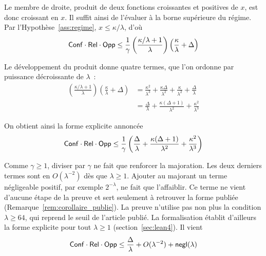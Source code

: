 \begin{sloppypar}
\begin{Preuve}
    Le membre de droite, produit de deux fonctions croissantes et
    positives de $x$, est donc croissant en $x$. Il suffit ainsi de
    l'\'evaluer \`a la borne sup\'erieure du r\'egime. Par
    l'Hypoth\`ese~\ref{ass:regime}, $x \leq \kappa/\lambda$, d'o\`u
    \begin{equation}
    \mathsf{Conf} \cdot \mathsf{Rel} \cdot \mathsf{Opp} \leq \frac{1}{\gamma}\left(\frac{\kappa/\lambda + 1}{\lambda}\right)\left(\frac{\kappa}{\lambda} + \Delta\right)
    \end{equation}

    Le d\'eveloppement du produit donne quatre termes, que l'on ordonne par
    puissance d\'ecroissante de $\lambda$~:
    \begin{align}
    \left(\frac{\kappa/\lambda + 1}{\lambda}\right)\left(\frac{\kappa}{\lambda} + \Delta\right)
    &= \frac{\kappa^2}{\lambda^3} + \frac{\kappa\Delta}{\lambda^2}
     + \frac{\kappa}{\lambda^2} + \frac{\Delta}{\lambda} \nonumber \\
    &= \frac{\Delta}{\lambda} + \frac{\kappa(\Delta + 1)}{\lambda^2} + \frac{\kappa^2}{\lambda^3}
    \end{align}

    On obtient ainsi la forme explicite annonc\'ee
    \begin{equation}
    \mathsf{Conf} \cdot \mathsf{Rel} \cdot \mathsf{Opp} \leq \frac{1}{\gamma}\left(\frac{\Delta}{\lambda} + \frac{\kappa(\Delta+1)}{\lambda^2} + \frac{\kappa^2}{\lambda^3}\right)
    \end{equation}

    Comme $\gamma \geq 1$, diviser par $\gamma$ ne fait que renforcer la
    majoration. Les deux derniers termes sont en $O(\lambda^{-2})$ d\`es que
    $\lambda \geq 1$. Ajouter au majorant un terme n\'egligeable positif, par exemple
    $2^{-\lambda}$, ne fait que l'affaiblir. Ce terme ne vient d'aucune \'etape de la
    preuve et sert seulement \`a retrouver la forme publi\'ee
    (Remarque~\ref{rem:corollaire_publie}). La preuve n'utilise pas non plus la
    condition $\lambda \geq 64$, qui reprend le seuil de l'article publi\'e. La
    formalisation \'etablit d'ailleurs la forme explicite pour tout $\lambda \geq 1$
    (section~\ref{sec:lean4}). Il vient
    \begin{equation}
    \mathsf{Conf} \cdot \mathsf{Rel} \cdot \mathsf{Opp} \leq \frac{\Delta}{\lambda} + O(\lambda^{-2}) + \mathsf{negl}(\lambda)
    \end{equation}


\end{Preuve}
\end{sloppypar}
